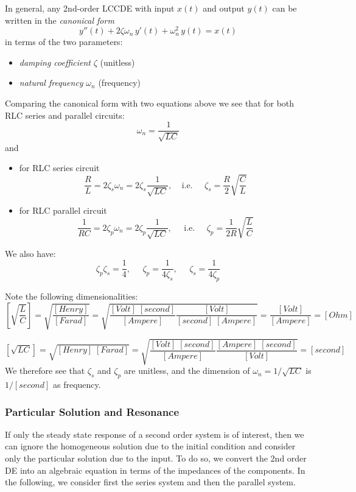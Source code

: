 In general, any 2nd-order LCCDE with input $x(t)$ and output $y(t)$
can be written in the {\em canonical form}
\[ 
y''(t)+2\zeta\omega_n\,y'(t)+\omega_n^2\, y(t)= x(t) 
\]
in terms of the two parameters:
\begin{itemize}
\item {\em damping coefficient} $\zeta$ (unitless)
\item {\em natural frequency} $\omega_n$ (frequency)
\end{itemize}
Comparing the canonical form with two equations above we see that
for both RLC series and parallel circuits:
\[
\omega_n=\frac{1}{\sqrt{LC}}
\]
and
\begin{itemize}
\item for RLC series circuit
  \[
  \frac{R}{L}=2\zeta_s\omega_n=2\zeta_s\frac{1}{\sqrt{LC}},\;\;\;\;\mbox{i.e.}\;\;\;\;\;
  \zeta_s=\frac{R}{2}\sqrt{\frac{C}{L}}
  \]
\item for RLC parallel circuit
  \[
  \frac{1}{RC}=2\zeta_p\omega_n=2\zeta_p\frac{1}{\sqrt{LC}},\;\;\;\;\;\mbox{i.e.}\;\;\;\;\;
  \zeta_p=\frac{1}{2R}\sqrt{\frac{L}{C}}
  \]  
\end{itemize}
We also have:
\[
\zeta_p \zeta_s=\frac{1}{4},\;\;\;\;\;\zeta_p=\frac{1}{4\zeta_s},
\;\;\;\;\;\zeta_s=\frac{1}{4\zeta_p}
\]

Note the following dimensionalities:
\[ 
\left[\sqrt{\frac{L}{C}}\right]=\sqrt{\frac{[Henry]}{[Farad]}}
=\sqrt{\frac{[Volt]\;[second]}{[Ampere]}\frac{[Volt]}{[second]\;[Ampere]}}
=\frac{[Volt]}{[Ampere]}=[Ohm] 
\]

\[ 
\left[ \sqrt{LC} \right]=\sqrt{[Henry]\;[Farad]}
=\sqrt{\frac{[Volt]\;[second]}{[Ampere]}\frac{[Ampere]\;[second]}{[Volt]}}
=[second]
\]
We therefore see that $\zeta_s$ and $\zeta_p$ are unitless, and the
dimension of $\omega_n=1/\sqrt{LC}$ is $1/[second]$ as frequency.
\begin{comment}
  \[ 
  \left[\sqrt{\frac{L}{C}}\right]=\sqrt{\frac{H}{F}}
  =\sqrt{\frac{V\;s}{A}\;\;\frac{V}{s\;A}}=\frac{V}{A}=\Omega
  \]
  \[ 
  \left[\sqrt{LC}\right]=\sqrt{H\; F}=\sqrt{ \frac{V\;s}{A} \frac{A\;s}{V} }
  =s
  \]
\end{comment}



\subsubsection*{Particular Solution and Resonance}

If only the steady state response of a second order system is of interest, 
then we can ignore the homogeneous solution due to the initial condition 
and consider only the particular solution due to the input. To do so, we
convert the 2nd order DE into an algebraic equation in terms of the 
impedances of the components. In the following, we consider first the 
series system and then the parallel system.

